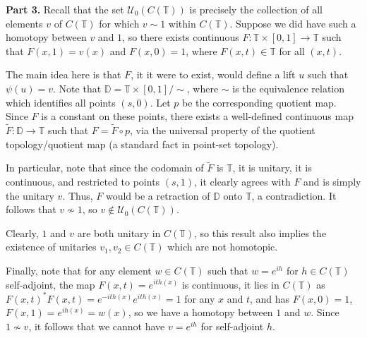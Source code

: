 \documentclass[aps,pra,showpacs,notitlepage,onecolumn,superscriptaddress,nofootinbib]{revtex4-1}
\theoremstyle{definition}
\begin{document}
\noindent \textbf{Part 3.} Recall that the set $\mathcal{U}_0(C(\mathbb{T}))$ is precisely the collection of all elements $v$ of $C(\mathbb{T})$ for which $v \sim 1$ within $C(\mathbb{T})$.
Suppose we did have such a homotopy between $v$ and $1$, so there exists continuous $F : \mathbb{T} \times [0, 1] \rightarrow \mathbb{T}$ such that $F(x, 1) = v(x)$ and $F(x, 0) = 1$,
where $F(x, t) \in \mathbb{T}$ for all $(x, t)$.

The main idea here is that $F$, it it were to exist, would define a lift $u$ such that $\psi(u) = v$. Note that $\mathbb{D} = \mathbb{T} \times [0, 1] / \sim$, where $\sim$ is the equivalence relation
which identifies all points $(s, 0)$. Let $p$ be the corresponding quotient map. Since $F$ is a constant on these points, there exists a well-defined continuous map $\widetilde{F} : \mathbb{D} \rightarrow \mathbb{T}$
such that $F = \widetilde{F} \circ p$, via the universal property of the quotient topology/quotient map (a standard fact in point-set topology).

In particular, note that since the codomain of $\widetilde{F}$ is $\mathbb{T}$, it is unitary, it is continuous, and restricted to points $(s, 1)$, it clearly agrees with $F$ and is simply the unitary $v$.
Thus, $F$ would be a retraction of $\mathbb{D}$ onto $\mathbb{T}$, a contradiction. It follows that $v \nsim 1$, so $v \notin \mathcal{U}_0(C(\mathbb{T}))$.

Clearly, $1$ and $v$ are both unitary in $C(\mathbb{T})$, so this result also implies the existence of unitaries $v_1, v_2 \in C(\mathbb{T})$ which are not homotopic.

Finally, note that for any element $w \in C(\mathbb{T})$ such that $w = e^{ih}$ for $h \in C(\mathbb{T})$ self-adjoint, the map $F(x, t) = e^{i t h(x)}$ is continuous,
it lies in $C(\mathbb{T})$ as $F(x, t)^{*} F(x, t) = e^{-i t h(x)} e^{i t h(x)} = 1$ for any $x$ and $t$, and has $F(x, 0) = 1$, $F(x, 1) = e^{i h(x)} = w(x)$,
so we have a homotopy between $1$ and $w$. Since $1 \nsim v$, it follows that we cannot have $v = e^{ih}$ for self-adjoint $h$.
\end{document}
